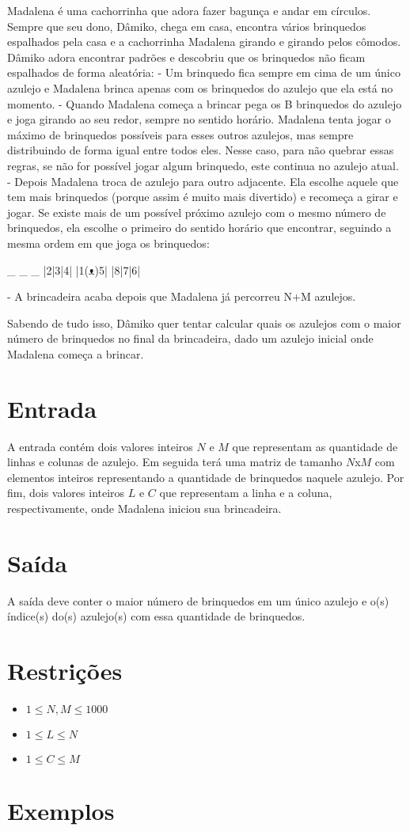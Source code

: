 Madalena é uma cachorrinha que adora fazer bagunça e andar em círculos. Sempre que seu dono, Dâmiko, chega em casa, encontra vários brinquedos espalhados pela casa e a cachorrinha Madalena girando e girando pelos cômodos.
Dâmiko adora encontrar padrões e descobriu que os brinquedos não ficam espalhados de forma aleatória:
- Um brinquedo fica sempre em cima de um único azulejo e Madalena brinca apenas com os brinquedos do azulejo que ela está no momento.
- Quando Madalena começa a brincar pega os B brinquedos do azulejo e joga girando ao seu redor, sempre no sentido horário.
Madalena tenta jogar o máximo de brinquedos possíveis para esses outros azulejos, mas sempre distribuindo de forma igual entre todos eles. Nesse caso, para não quebrar essas regras, se não for possível jogar algum brinquedo, este continua no azulejo atual.
- Depois Madalena troca de azulejo para outro adjacente. Ela escolhe aquele que tem mais brinquedos (porque assim é muito mais divertido) e recomeça a girar e jogar. Se existe mais de um possível próximo azulejo com o mesmo número de brinquedos, ela escolhe o primeiro do sentido horário que encontrar, seguindo a mesma ordem em que joga os brinquedos:

 _ _ _
|2|3|4|
|1(ᴥ)5|
|8|7|6|

- A brincadeira acaba depois que Madalena já percorreu N+M azulejos.

Sabendo de tudo isso, Dâmiko quer tentar calcular quais os azulejos com o maior número de brinquedos no final da brincadeira, dado um azulejo inicial onde Madalena começa a brincar.

\section*{Entrada}

A entrada contém dois valores inteiros $N$ e $M$ que representam as quantidade de linhas e colunas de azulejo. Em seguida terá uma matriz de tamanho $N$x$M$ com elementos inteiros representando a quantidade de brinquedos naquele azulejo.
Por fim, dois valores inteiros $L$ e $C$ que representam a linha e a coluna, respectivamente, onde Madalena iniciou sua brincadeira.

\section*{Saída}

A saída deve conter o maior número de brinquedos em um único azulejo e o(s) índice(s) do(s) azulejo(s) com essa quantidade de brinquedos.


\section*{Restrições}

\begin{itemize}
\item $1 \leq N, M \leq 1000$
\item $1 \leq L \leq N$
\item $1 \leq C \leq M$
\end{itemize}


\section*{Exemplos}

\exemplo

